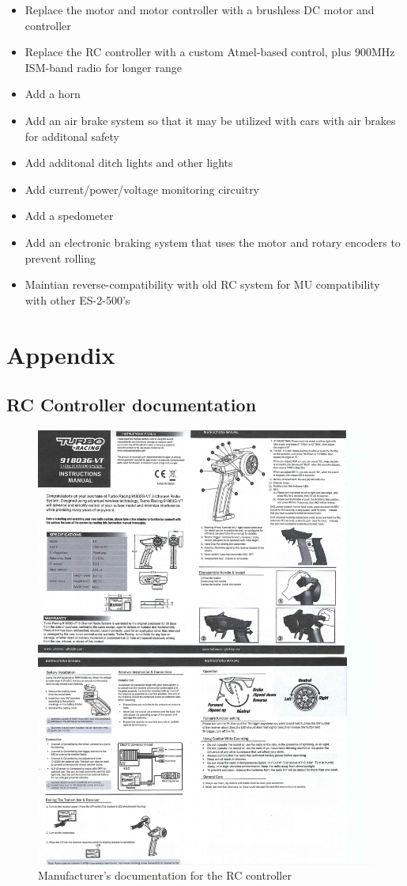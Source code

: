 \documentclass{book}
\begin{document}
\begin{itemize}
    \item {Replace the motor and motor controller with a brushless DC motor and controller}
    \item {Replace the RC controller with a custom Atmel-based control, plus 900MHz ISM-band radio for longer range}
    \item {Add a horn}
    \item {Add an air brake system so that it may be utilized with cars with air brakes for additonal safety}
    \item {Add additonal ditch lights and other lights}
    \item {Add current/power/voltage monitoring circuitry}
    \item {Add a spedometer}
    \item {Add an electronic braking system that uses the motor and rotary encoders to prevent rolling}
    \item {Maintian reverse-compatibility with old RC system for MU compatibility with other ES-2-500's}
\end{itemize}

\chapter{Appendix}
\section{RC Controller documentation}

\begin{figure}[h]
    \centering
    \includegraphics[width=1\textwidth]{controller.jpg}
    \caption{Manufacturer's documentation for the RC controller}
\end{figure}
\end{document}
